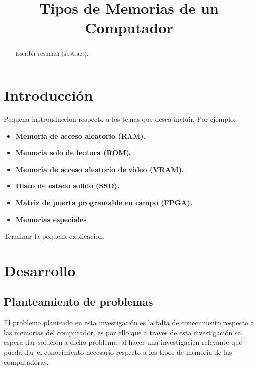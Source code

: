 \documentclass[conference]{IEEEtran}
\begin{document}
\title{Tipos de Memorias de un Computador}

\author{
}

\maketitle

\begin{abstract} %
Escribir resumen (abstract).

\end{abstract}

\section{Introducci\'on}
Pequena instrouduccion respecto a los temas que desea incluir. Por ejemplo:
\begin{itemize}
    \item \textbf{Memoria de acceso aleatorio (RAM).}
    \item \textbf{Memoria solo de lectura (ROM).}
    \item \textbf{Memoria de acceso aleatorio de video (VRAM).}
    \item \textbf{Disco de estado solido (SSD).}
    \item \textbf{Matriz de puerta programable en campo (FPGA).}
    \item \textbf{Memorias especiales}
\end{itemize}
Terminar la pequena explicacion.

\section{Desarrollo}

\subsection{Planteamiento de problemas} %
El problema planteado en esta investigaci\'on es la falta de conocimiento respecto a las memorias
del computador, es por ello que a trav\'es de esta investigaci\'on se espera dar soluci\'on a
dicho problema, al hacer una investigaci\'on relevante que pueda dar el conocimiento necesario
respecto a los tipos de memoria de las computadoras.
\end{document}
